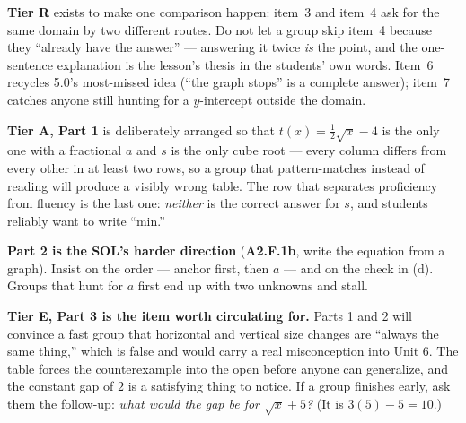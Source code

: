 \documentclass[10pt]{article}
\begin{document}
\begin{teachernote}
\small
\textbf{Tier R} exists to make one comparison happen: item~3 and item~4 ask for the same domain by
two different routes. Do not let a group skip item~4 because they ``already have the answer'' ---
answering it twice \emph{is} the point, and the one-sentence explanation is the lesson's thesis in
the students' own words. Item~6 recycles 5.0's most-missed idea (``the graph stops'' is a complete
answer); item~7 catches anyone still hunting for a $y$-intercept outside the domain.

\textbf{Tier A, Part 1} is deliberately arranged so that $t(x)=\tfrac12\sqrt{x}-4$ is the only one
with a fractional $a$ and $s$ is the only cube root --- every column differs from every other in at
least two rows, so a group that pattern-matches instead of reading will produce a visibly wrong
table. The row that separates proficiency from fluency is the last one: \emph{neither} is the
correct answer for $s$, and students reliably want to write ``min.''

\textbf{Part 2 is the SOL's harder direction} (\textbf{A2.F.1b}, write the equation from a graph).
Insist on the order --- anchor first, then $a$ --- and on the check in (d). Groups that hunt for $a$
first end up with two unknowns and stall.

\textbf{Tier E, Part 3 is the item worth circulating for.} Parts 1 and 2 will convince a fast group
that horizontal and vertical size changes are ``always the same thing,'' which is false and would
carry a real misconception into Unit 6. The table forces the counterexample into the open before
anyone can generalize, and the constant gap of $2$ is a satisfying thing to notice. If a group
finishes early, ask them the follow-up: \emph{what would the gap be for $\sqrt{x}+5$?} (It is
$3(5)-5=10$.)
\end{teachernote}
\end{document}
